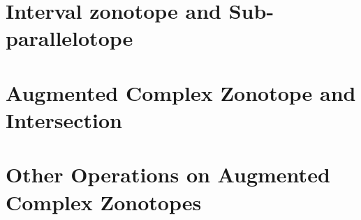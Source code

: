 

\section{Interval zonotope and Sub-parallelotope}
 

\section{Augmented Complex Zonotope and Intersection}
 

\section{Other Operations on Augmented Complex Zonotopes}

